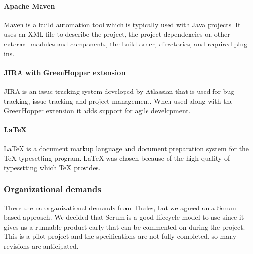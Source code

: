 \paragraph{Apache Maven}
Maven is a build automation tool which is typically used with Java projects. It uses an XML file to describe the project, the project dependencies on other external modules and components, the build order, directories, and required plug-ins.   

\paragraph{JIRA with GreenHopper extension}
JIRA is an issue tracking system developed by Atlassian that is used for bug tracking, issue tracking and project management. When used along with the GreenHopper extension it adds support for agile development.

\paragraph{LaTeX}
LaTeX is a document markup language and document preparation system for the TeX typesetting program. LaTeX was chosen because of the high quality of typesetting which TeX provides.

\subsubsection{Organizational demands}
There are no organizational demands from Thales, but we agreed on a Scrum based approach. We decided that Scrum is a good lifecycle-model to use since it gives us a runnable product early that can be commented on during the project. This is a pilot project and the specifications are not fully completed, so many revisions are anticipated.

